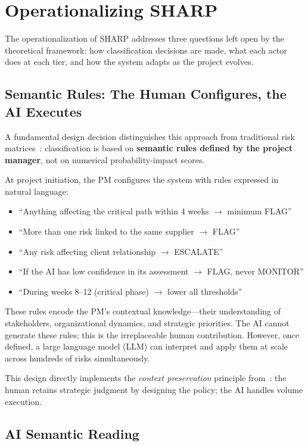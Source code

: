 \documentclass[runningheads]{llncs}
\begin{document}
\section{Operationalizing SHARP}

The operationalization of SHARP addresses three questions left open by the theoretical framework: how classification decisions are made, what each actor does at each tier, and how the system adapts as the project evolves.

\subsection{Semantic Rules: The Human Configures, the AI Executes}

A fundamental design decision distinguishes this approach from traditional risk matrices~\cite{acebes2024}: classification is based on \textbf{semantic rules defined by the project manager}, not on numerical probability-impact scores.

At project initiation, the PM configures the system with rules expressed in natural language:
\begin{itemize}
    \item ``Anything affecting the critical path within 4 weeks $\to$ minimum FLAG''
    \item ``More than one risk linked to the same supplier $\to$ FLAG''
    \item ``Any risk affecting client relationship $\to$ ESCALATE''
    \item ``If the AI has low confidence in its assessment $\to$ FLAG, never MONITOR''
    \item ``During weeks 8--12 (critical phase) $\to$ lower all thresholds''
\end{itemize}

These rules encode the PM's contextual knowledge---their understanding of stakeholders, organizational dynamics, and strategic priorities. The AI cannot generate these rules; this is the irreplaceable human contribution. However, once defined, a large language model (LLM) can interpret and apply them at scale across hundreds of risks simultaneously.

This design directly implements the \emph{context preservation} principle from~\cite{bara2025catania}: the human retains strategic judgment by designing the policy; the AI handles volume execution.

\subsection{AI Semantic Reading}
\end{document}
